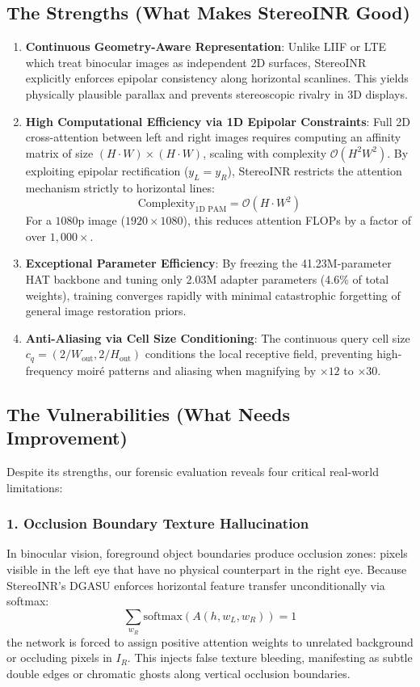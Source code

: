 \documentclass[10pt,journal,compsoc]{IEEEtran}
\begin{document}
\subsection{The Strengths (What Makes StereoINR Good)}
\begin{enumerate}
    \item \textbf{Continuous Geometry-Aware Representation}: Unlike LIIF or LTE which treat binocular images as independent 2D surfaces, StereoINR explicitly enforces epipolar consistency along horizontal scanlines. This yields physically plausible parallax and prevents stereoscopic rivalry in 3D displays.
    \item \textbf{High Computational Efficiency via 1D Epipolar Constraints}: Full 2D cross-attention between left and right images requires computing an affinity matrix of size $(H \cdot W) \times (H \cdot W)$, scaling with complexity $\mathcal{O}(H^2 W^2)$. By exploiting epipolar rectification ($y_L = y_R$), StereoINR restricts the attention mechanism strictly to horizontal lines:
    \begin{equation}
    \text{Complexity}_{\text{1D PAM}} = \mathcal{O}(H \cdot W^2)
    \end{equation}
    For a $1080\text{p}$ image ($1920 \times 1080$), this reduces attention FLOPs by a factor of over $1,000\times$.
    \item \textbf{Exceptional Parameter Efficiency}: By freezing the 41.23M-parameter HAT backbone and tuning only 2.03M adapter parameters (4.6\% of total weights), training converges rapidly with minimal catastrophic forgetting of general image restoration priors.
    \item \textbf{Anti-Aliasing via Cell Size Conditioning}: The continuous query cell size $c_q = (2/W_{\text{out}}, 2/H_{\text{out}})$ conditions the local receptive field, preventing high-frequency moir\'{e} patterns and aliasing when magnifying by $\times 12$ to $\times 30$.
\end{enumerate}

\subsection{The Vulnerabilities (What Needs Improvement)}
Despite its strengths, our forensic evaluation reveals four critical real-world limitations:

\subsubsection{1. Occlusion Boundary Texture Hallucination}
In binocular vision, foreground object boundaries produce occlusion zones: pixels visible in the left eye that have no physical counterpart in the right eye. Because StereoINR's DGASU enforces horizontal feature transfer unconditionally via softmax:
\begin{equation}
\sum_{w_R} \text{softmax}(A(h, w_L, w_R)) = 1
\end{equation}
the network is forced to assign positive attention weights to unrelated background or occluding pixels in $I_R$. This injects false texture bleeding, manifesting as subtle double edges or chromatic ghosts along vertical occlusion boundaries.
\end{document}
